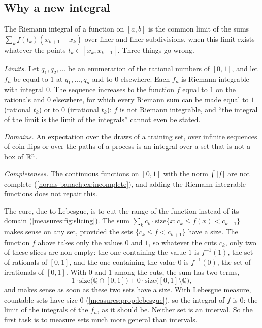 \begin{notechapter}
\section{Why a new integral}\label{measures:sec:why}

The Riemann integral of a function on $[a, b]$ is the common limit of
the sums $\sum_kf(t_k)(x_{k+1} - x_k)$ over finer and finer subdivisions,
when this limit exists whatever the points $t_k\in[x_k, x_{k+1}]$. Three
things go wrong.

\emph{Limits.} Let $q_1, q_2, \dots$ be an enumeration of the rational
numbers of $[0, 1]$, and let $f_n$ be equal to $1$ at $q_1,\dots,q_n$
and to $0$ elsewhere. Each $f_n$ is Riemann integrable with integral
$0$. The sequence increases to the function $f$ equal to $1$ on the
rationals and $0$ elsewhere, for which every Riemann sum can be made
equal to $1$ (rational $t_k$) or to $0$ (irrational $t_k$): $f$ is not
Riemann integrable, and ``the integral of the limit is the limit of the
integrals'' cannot even be stated.

\emph{Domains.} An expectation over the draws of a training set, over
infinite sequences of coin flips or over the paths of a process is an
integral over a set that is not a box of $\mathbb{R}^n$.

\emph{Completeness.} The continuous functions on $[0, 1]$ with the norm
$\int\left|f\right|$ are not complete (\cref{norms-banach:ex:incomplete}), and
adding the Riemann integrable functions does not repair this.

The cure, due to Lebesgue, is to cut the range of the function instead
of its domain (\cref{measures:fig:slicing}). The sum
$\sum_kc_k\cdot\text{size}\{x : c_k\leq f(x) < c_{k+1}\}$ makes sense on
any set, provided the sets $\{c_k\leq f < c_{k+1}\}$ have a size. The
function $f$ above takes only the values $0$ and $1$, so whatever the
cuts $c_k$, only two of these slices are non-empty: the one containing
the value $1$ is $f^{-1}(1)$, the set of rationals of $[0, 1]$, and the
one containing the value $0$ is $f^{-1}(0)$, the set of irrationals of
$[0, 1]$. With $0$ and $1$ among the cuts, the sum has two terms,
\[
  1\cdot\text{size}\bigl(\mathbb Q\cap[0, 1]\bigr)
  + 0\cdot\text{size}\bigl([0, 1]\setminus\mathbb Q\bigr) ,
\]
and makes sense as soon as these two sets have a size. With Lebesgue
measure, countable sets have size $0$
(\cref{measures:prop:lebesgue}), so the integral of $f$ is $0$: the
limit of the integrals of the $f_n$, as it should be. Neither set is
an interval. So the first task is to measure sets much more general
than intervals.


\end{notechapter}
